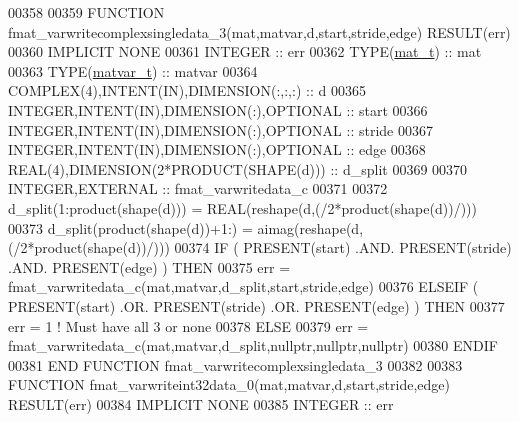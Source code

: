 \begin{DoxyCode}
00358 
00359 \textcolor{keyword}{FUNCTION }fmat\_varwritecomplexsingledata\_3(mat,matvar,d,start,stride,edge) \textcolor{keyword}{RESULT}(err)
00360 \textcolor{keywordtype}{IMPLICIT NONE}
00361     \textcolor{keywordtype}{INTEGER}                                    :: err
00362     \textcolor{keywordtype}{TYPE}(\hyperlink{group___m_a_t_gab0fc888f5a5d79943b16284b1f91c2e8}{mat\_t})                                :: mat
00363     \textcolor{keywordtype}{TYPE}(\hyperlink{group___m_a_t_structmatvar__t}{matvar\_t})                             :: matvar
00364     \textcolor{keywordtype}{COMPLEX(4)},\textcolor{keywordtype}{INTENT(IN)},\textcolor{keywordtype}{DIMENSION(:,:,:)} :: d
00365     \textcolor{keywordtype}{INTEGER},\textcolor{keywordtype}{INTENT(IN)},\textcolor{keywordtype}{DIMENSION(:)},\textcolor{keywordtype}{OPTIONAL} :: start
00366     \textcolor{keywordtype}{INTEGER},\textcolor{keywordtype}{INTENT(IN)},\textcolor{keywordtype}{DIMENSION(:)},\textcolor{keywordtype}{OPTIONAL} :: stride
00367     \textcolor{keywordtype}{INTEGER},\textcolor{keywordtype}{INTENT(IN)},\textcolor{keywordtype}{DIMENSION(:)},\textcolor{keywordtype}{OPTIONAL} :: edge
00368     \textcolor{keywordtype}{REAL(4)},\textcolor{keywordtype}{DIMENSION(2*PRODUCT(SHAPE(d)))} :: d\_split
00369 
00370     \textcolor{keywordtype}{INTEGER},\textcolor{keywordtype}{EXTERNAL}                         :: fmat\_varwritedata\_c
00371 
00372     d\_split(1:product(shape(d)))  = \textcolor{keywordtype}{REAL}(reshape(d,(/2*product(shape(d))/)))
00373     d\_split(product(shape(d))+1:) = aimag(reshape(d,(/2*product(shape(d))/)))
00374     \textcolor{keywordflow}{IF} ( \textcolor{keyword}{PRESENT}(start) .AND. \textcolor{keyword}{PRESENT}(stride) .AND. \textcolor{keyword}{PRESENT}(edge) ) \textcolor{keywordflow}{THEN}
00375         err = fmat\_varwritedata\_c(mat,matvar,d\_split,start,stride,edge)
00376     \textcolor{keywordflow}{ELSEIF} ( \textcolor{keyword}{PRESENT}(start) .OR. \textcolor{keyword}{PRESENT}(stride) .OR. \textcolor{keyword}{PRESENT}(edge) ) \textcolor{keywordflow}{THEN}
00377         err = 1    \textcolor{comment}{! Must have all 3 or none}
00378     \textcolor{keywordflow}{ELSE}
00379         err = fmat\_varwritedata\_c(mat,matvar,d\_split,nullptr,nullptr,nullptr)
00380 \textcolor{keywordflow}{    ENDIF}
00381 \textcolor{keyword}{END FUNCTION }fmat\_varwritecomplexsingledata\_3
00382 
00383 \textcolor{keyword}{FUNCTION }fmat\_varwriteint32data\_0(mat,matvar,d,start,stride,edge) \textcolor{keyword}{RESULT}(err)
00384 \textcolor{keywordtype}{IMPLICIT NONE}
00385     \textcolor{keywordtype}{INTEGER}                                  :: err

\end{DoxyCode}
